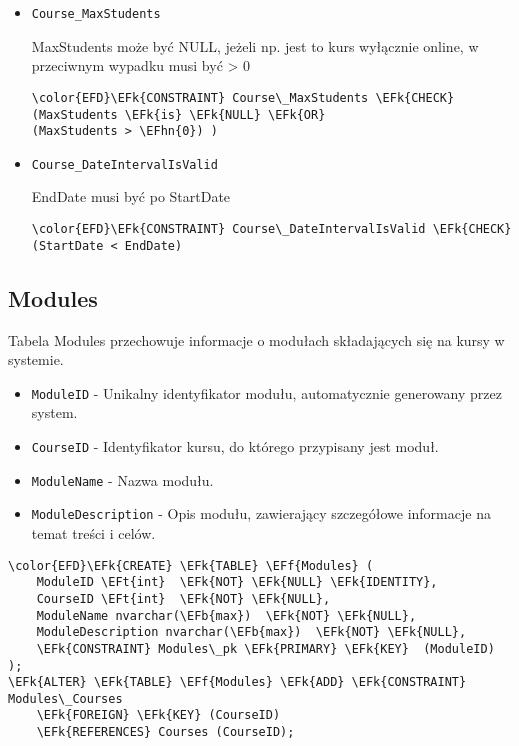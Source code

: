 \documentclass[11pt]{article}
\newcommand{\EFk}[1]{\textcolor{EFk}{\textbf{#1}}} %
\newcommand{\EFb}[1]{\textcolor{EFb}{\textbf{#1}}} %
\newcommand{\EFf}[1]{\textcolor{EFf}{#1}} %
\newcommand{\EFt}[1]{\textcolor{EFt}{\textbf{#1}}} %
\newcommand{\EFhn}[1]{\textcolor{EFhn}{#1}} %
\begin{document}
\begin{itemize}
\item \texttt{Course\_MaxStudents}

MaxStudents może być NULL, jeżeli np. jest to kurs wyłącznie online, w przeciwnym wypadku musi być > 0
\begin{Code}
\begin{Verbatim}
\color{EFD}\EFk{CONSTRAINT} Course\_MaxStudents \EFk{CHECK}
(MaxStudents \EFk{is} \EFk{NULL} \EFk{OR}
(MaxStudents > \EFhn{0}) )
\end{Verbatim}
\end{Code}
\item \texttt{Course\_DateIntervalIsValid}

EndDate musi być po StartDate
\begin{Code}
\begin{Verbatim}
\color{EFD}\EFk{CONSTRAINT} Course\_DateIntervalIsValid \EFk{CHECK}
(StartDate < EndDate)
\end{Verbatim}
\end{Code}
\end{itemize}
\subsection{Modules}
\label{sec:orgdb847b9}
Tabela Modules przechowuje informacje o modułach składających się na kursy w systemie.
\begin{itemize}
\item \texttt{ModuleID} - Unikalny identyfikator modułu, automatycznie generowany przez system.
\item \texttt{CourseID} - Identyfikator kursu, do którego przypisany jest moduł.
\item \texttt{ModuleName} - Nazwa modułu.
\item \texttt{ModuleDescription} - Opis modułu, zawierający szczegółowe informacje na temat treści i celów.
\end{itemize}
\begin{Code}
\begin{Verbatim}
\color{EFD}\EFk{CREATE} \EFk{TABLE} \EFf{Modules} (
    ModuleID \EFt{int}  \EFk{NOT} \EFk{NULL} \EFk{IDENTITY},
    CourseID \EFt{int}  \EFk{NOT} \EFk{NULL},
    ModuleName nvarchar(\EFb{max})  \EFk{NOT} \EFk{NULL},
    ModuleDescription nvarchar(\EFb{max})  \EFk{NOT} \EFk{NULL},
    \EFk{CONSTRAINT} Modules\_pk \EFk{PRIMARY} \EFk{KEY}  (ModuleID)
);
\EFk{ALTER} \EFk{TABLE} \EFf{Modules} \EFk{ADD} \EFk{CONSTRAINT} Modules\_Courses
    \EFk{FOREIGN} \EFk{KEY} (CourseID)
    \EFk{REFERENCES} Courses (CourseID);
\end{Verbatim}
\end{Code}
\end{document}
